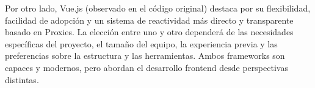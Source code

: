 \documentclass[11pt, a4paper]{article}
\begin{document}
Por otro lado, Vue.js (observado en el código original) destaca por su flexibilidad, facilidad de adopción y un sistema de reactividad más directo y transparente basado en Proxies. La elección entre uno y otro dependerá de las necesidades específicas del proyecto, el tamaño del equipo, la experiencia previa y las preferencias sobre la estructura y las herramientas. Ambos frameworks son capaces y modernos, pero abordan el desarrollo frontend desde perspectivas distintas.
\end{document}
